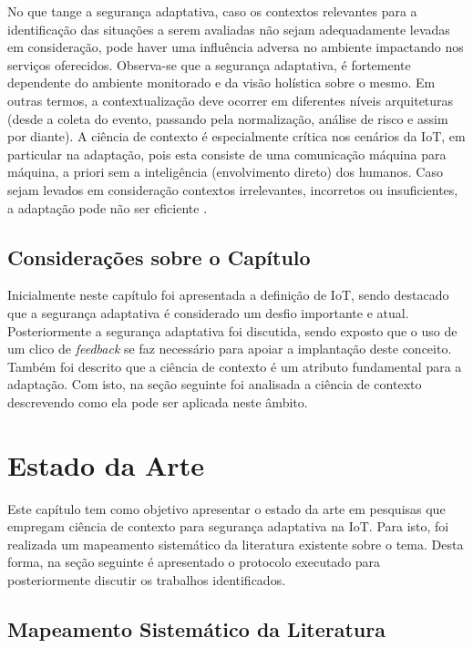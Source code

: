 \documentclass[tid,table]{texufpel} %
\begin{document}
No que tange a segurança adaptativa, caso os contextos relevantes para a identificação das situações a serem avaliadas não sejam adequadamente levadas em consideração, pode haver uma influência adversa no ambiente impactando nos serviços oferecidos. Observa-se que a segurança adaptativa, é fortemente dependente do ambiente monitorado e da visão holística sobre o mesmo. Em outras termos, a contextualização deve ocorrer em diferentes níveis arquiteturas (desde a coleta do evento, passando pela normalização, análise de risco e assim por diante). A ciência de contexto é especialmente crítica nos cenários da IoT, em particular na adaptação, pois esta consiste de uma comunicação máquina para máquina, a priori sem a inteligência (envolvimento direto) dos humanos. Caso sejam levados em consideração contextos irrelevantes, incorretos ou insuficientes, a adaptação pode não ser eficiente \cite{aman15}.



\section{Considerações sobre o Capítulo}

Inicialmente neste capítulo foi apresentada a definição de IoT, sendo destacado que a segurança adaptativa é considerado um desfio importante e atual. Posteriormente a segurança adaptativa foi discutida, sendo exposto que o uso de um clico de \textit{feedback} se faz necessário para apoiar a implantação deste conceito. Também foi descrito que a ciência de contexto é um atributo fundamental para a adaptação. Com isto, na seção seguinte foi analisada a ciência de contexto descrevendo como ela pode ser aplicada neste âmbito.


\chapter{Estado da Arte} 

Este capítulo tem como objetivo apresentar o estado da arte em pesquisas que empregam ciência de contexto para segurança adaptativa na IoT. Para isto, foi realizada um mapeamento sistemático da literatura existente sobre o tema. Desta forma, na seção seguinte é apresentado o protocolo executado para posteriormente discutir os trabalhos identificados.


\section{Mapeamento Sistemático da Literatura}
\end{document}
